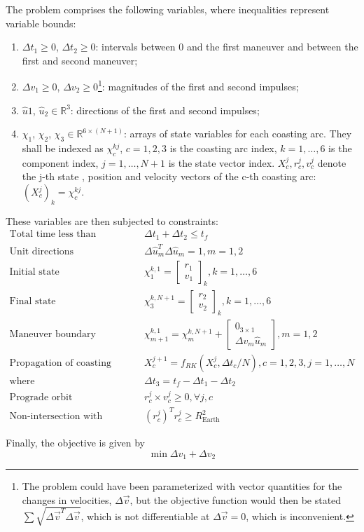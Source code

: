 The problem comprises the following variables, where inequalities represent variable bounds:
\begin{enumerate}
    \item \(\Delta t_1 \geq 0\), \(\Delta t_2 \geq 0\): intervals between 0 and the first maneuver and between the first and second maneuver;
    \item \(\Delta v_1 \geq 0\), \(\Delta v_2 \geq 0\)\footnote{The problem could have been parameterized with vector quantities for the changes in velocities, \(\Delta \vec v\), but the objective function would then be stated \(\sum \sqrt{\Delta \vec v^T \Delta \vec v}\), which is not differentiable at \(\Delta \vec v = 0\), which is inconvenient.}: magnitudes of the first and second impulses;
    \item \(\hat u 1\), \(\hat u_2 \in \mathbb{R}^3\): directions of the first and second impulses;
    \item \(\chi_1\), \(\chi_2\), \(\chi_3 \in \mathbb{R}^{6 \times (N+1)}\): arrays of state variables for each coasting arc. They shall be indexed as \(\chi_c^{kj}\), \(c=1, 2, 3\) is the coasting arc index, \(k=1,\dots,6\) is the component index, \(j = 1,\dots,N+1\) is the state vector index. \(X^j_c, r^j_c, v^j_c\) denote the j-th state , position and velocity vectors of the c-th coasting arc: \((X^j_c)_k = \chi_c^{kj}\).
\end{enumerate}

These variables are then subjected to constraints:
\begin{align}
    \text{Total time less than transfer time} &\qquad\Delta t_1 + \Delta t_2 \leq t_f \\
    \text{Unit directions} &\qquad\Delta \hat{u}_m^T \Delta \hat{u}_m = 1, m = 1, 2 \\
    \text{Initial state} &\qquad \chi_1^{k, 1} = \begin{bmatrix}
        r_1 \\ v_1
    \end{bmatrix}_k, k = 1,\dots, 6 \\
    \text{Final state} &\qquad \chi_3^{k, N+1} = \begin{bmatrix}
        r_2 \\ v_2
    \end{bmatrix}_k, k = 1,\dots, 6 \\
    \text{Maneuver boundary conditions} &\qquad \chi_{m+1}^{k, 1} = \chi_m^{k, N+1} + \begin{bmatrix}
        0_{3\times1} \\ \Delta v_m \hat{u}_m
    \end{bmatrix}, m=1, 2 \\
    \text{Propagation of coasting arcs} &\qquad X_c^{j+1} = f_{RK}(X_c^j, \Delta t_c / N), c=1, 2, 3, j=1,\dots,N \\
    \text{where} & \qquad \Delta t_3 = t_f - \Delta t_1 - \Delta t_2 \\
    \text{Prograde orbit} &\qquad r^j_c \times v^j_c \geq 0, \forall j, c \\
    \text{Non-intersection with Earth} &\qquad (r^j_c)^T r^j_c \geq R_{\text{Earth}}^2
\end{align}

Finally, the objective is given by
\begin{equation}
    \min \Delta v_1 + \Delta v_2
\end{equation}